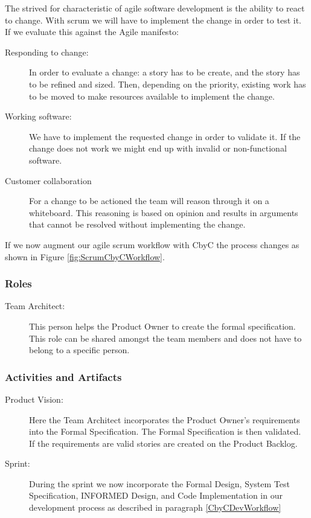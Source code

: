 The strived for characteristic of agile software development is the ability to 
react to change. With scrum we will have to implement the change in order to test
it. If we evaluate this against the Agile manifesto:
\begin{description}
	\item [Responding to change:]  In order to evaluate a change: a story has to be
		create, and the story has to be refined and sized. Then, depending on the 
		priority, existing work has to be moved to make resources available to implement
		the change. 
	\item [Working software:] We have to implement the requested change in order to
		validate it. If the change does not work we might end up with invalid or
		non-functional software.
	\item [Customer collaboration] For a change to be actioned the team will reason
		through it on a whiteboard. This reasoning is based on opinion and results in
		arguments that cannot be resolved without implementing the change.
\end{description}

If we now augment our agile scrum workflow with CbyC the process changes as shown in  Figure \ref{fig:ScrumCbyCWorkflow}.

\subsubsection{Roles}
\begin{description}
	\item [Team Architect:] This person helps the Product Owner to create the formal
		specification. This role can be shared amongst the team members and does not
		have to belong to a specific person.
\end{description}

\subsubsection{Activities and Artifacts}
\begin{description}
	\item [Product Vision:] Here the Team Architect incorporates the Product Owner's
		requirements into the Formal Specification. The Formal Specification is then 
		validated. If the requirements are valid stories are created on the Product
		Backlog.
	\item [Sprint:] During the sprint we now incorporate the Formal Design, System
		Test Specification, INFORMED Design, and Code Implementation in our development
		process as described in paragraph \ref{CbyCDevWorkflow}
\end{description}

